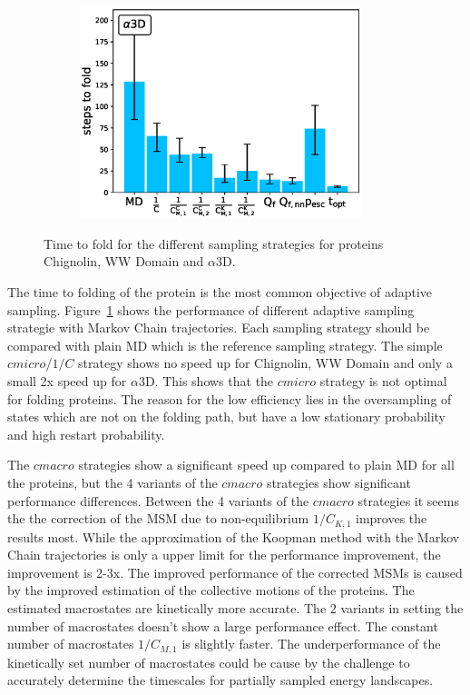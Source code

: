 \begin{figure}[H]
\begin{subfigure}[t]{0.5\textwidth}
    \includegraphics[width=0.9\textwidth]{figures/A3D_7_steps10000_nparallel100_fold.eps}   
  \end{subfigure}
  \caption{Time to fold for the different sampling strategies for proteins Chignolin, WW Domain and $\alpha$3D.}
  \label{fig:Time_fold}
\end{figure}


The time to folding of the protein is the most common objective of adaptive sampling. Figure~\ref{fig:Time_fold} shows the performance of different adaptive sampling strategie with Markov Chain trajectories.
Each sampling strategy should be compared with plain MD which is the reference sampling strategy.
The simple $cmicro$/$1/C$ strategy shows no speed up for Chignolin, WW Domain and only a small 2x speed up for $\alpha$3D. This shows that the $cmicro$ strategy is not optimal for folding proteins. The reason for the low efficiency lies in the oversampling of states which are not on the folding path, but have a low stationary probability and high restart probability.

The $cmacro$ strategies show a significant speed up compared to plain MD for all the proteins, but the 4 variants of the $cmacro$ strategies show significant performance differences.
Between the 4 variants of the $cmacro$ strategies it seems the the correction of the MSM due to non-equilibrium  $1/C_{K, 1}$ improves the results most. While the approximation of the Koopman method with the Markov Chain trajectories is only a upper limit for the performance improvement, the improvement is 2-3x. The improved performance of the corrected MSMs is caused by the improved estimation of the collective motions of the proteins. The estimated macrostates are kinetically more accurate. The 2 variants in setting the number of macrostates doesn't show a large performance effect. The constant number
of macrostates $1/C_{M, 1}$ is slightly faster. The underperformance of the kinetically set number of macrostates could be cause by the challenge to accurately determine the timescales for partially sampled energy landscapes.

